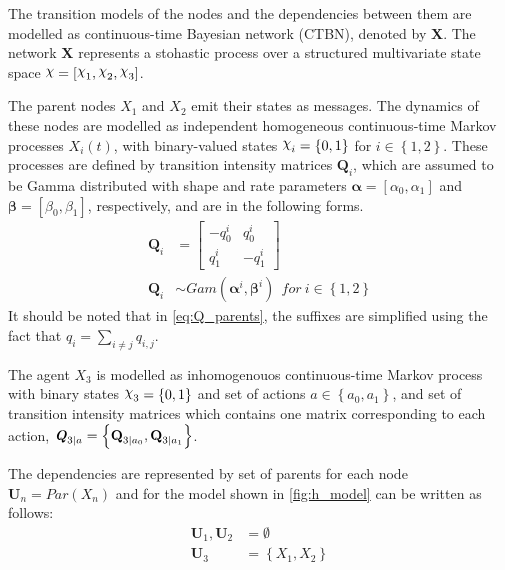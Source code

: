 The transition models of the nodes and the dependencies between them are modelled as continuous-time Bayesian network (CTBN), denoted by \textbf{X}. The network \textbf{X} represents a stohastic process over a structured multivariate state space $ \rchi = [\rchi_1, \rchi_2, \rchi_3] $. 

The parent nodes $X_{1}$ and $ X_{2} $ emit their states as messages. The dynamics  of these nodes are modelled as independent homogeneous continuous-time Markov processes $X_{i}(t)$, with binary-valued states $ \rchi_{i} = \left\lbrace 0, 1 \right\rbrace  $ for $ i \in \left\lbrace 1,2 \right\rbrace $. These processes are defined by transition intensity matrices $ \textbf{Q}_{i} $, which are assumed to be Gamma distributed with shape and rate parameters $ \boldsymbol{\alpha} = [\alpha_0, \alpha_1] $ and $ \boldsymbol{\beta} = [\beta_0, \beta_1] $, respectively, and are in the following forms.
\begin{align}
\textbf{Q}_i &= 
\begin{bmatrix}
-q^i_{0} & q^i_{0} \\
q^i_{1} &  -q^i_{1}
\end{bmatrix}
\label{eq:Q_parents}\\
\textbf{Q}_{i} &\sim Gam(\boldsymbol{\alpha}^i, \boldsymbol{\beta}^i)\ \ for\ i \in \left\lbrace 1,2\right\rbrace \label{eq:gamma_priors}
\end{align}
It should be noted that in \autoref{eq:Q_parents}, the suffixes are simplified using the fact that $ q_{i} = \sum_{i \neq j} q_{i,j}$.

The agent  $ X_{3} $ is modelled as inhomogenouos continuous-time Markov process with binary states $ \rchi_{3} = \left\lbrace 0, 1 \right\rbrace  $ and set of actions $ a \in \left\lbrace a_0, a_1\right\rbrace  $, and set of transition intensity matrices which contains one matrix corresponding to each action, $ \textbf{\textit{Q}}_{3 \mid a} = \left\lbrace \textbf{Q}_{3\mid a_{0}}, \textbf{Q}_{3\mid a_{1}} \right\rbrace $.

The dependencies are represented by set of parents for each node $ \textbf{U}_{n} = Par(X_n) $ and for the model shown in \cref{fig:h_model} can be written as follows:
\begin{align*}
\textbf{U}_{1}, \textbf{U}_{2} & = \emptyset \\
\textbf{U}_{3} & = \left\lbrace X_1, X_2 \right\rbrace 
\end{align*}

